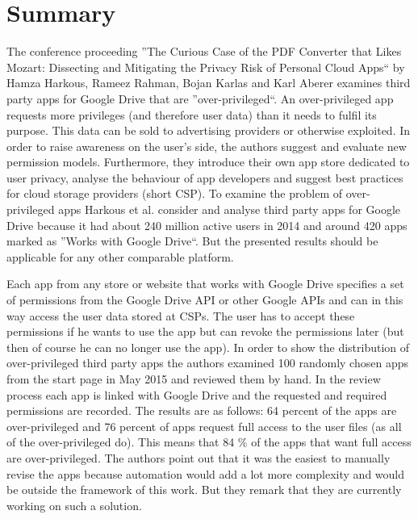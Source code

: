 \documentclass[11pt,twocolumn,a4paper,DIV=calc]{scrartcl}
\begin{document}
\section{Summary}
The conference proceeding ''The Curious Case of the PDF Converter that Likes Mozart: Dissecting and Mitigating the Privacy Risk of Personal Cloud Apps`` by Hamza Harkous, Rameez Rahman, Bojan Karlas and Karl Aberer \cite{Paper} examines third party apps for Google Drive that are ''over-privileged``. An over-privileged app requests more privileges (and therefore user data) than it needs to fulfil its purpose. This data can be sold to advertising providers or otherwise exploited. In order to raise awareness on the user's side, the authors suggest and evaluate new permission models. Furthermore, they introduce their own app store dedicated to user privacy, analyse the behaviour of app developers and suggest best practices for cloud storage providers (short CSP). To examine the problem of over-privileged apps Harkous et al. consider and analyse third party apps for Google Drive because it had about 240 million active users in 2014 and around 420 apps marked as ''Works with Google Drive``. But the presented results should be applicable for any other comparable platform. 

Each app from any store or website that works with Google Drive specifies a set of permissions from the Google Drive API or other Google APIs and can in this way access the user data stored at CSPs. The user has to accept these permissions if he wants to use the app but can revoke the permissions later (but then of course he can no longer use the app). In order to show the distribution of over-privileged third party apps the authors examined 100 randomly chosen apps from the start page in May 2015 and reviewed them by hand. In the review process each app is linked with Google Drive and the requested and required permissions are recorded. The results are as follows: 64 percent of the apps are over-privileged and 76 percent of apps request full access to the user files (as all of the over-privileged do). This means that 84 \% of the apps that want full access are over-privileged. The authors point out that it was the easiest to manually revise the apps because automation would add a lot more complexity and would be outside the framework of this work. But they remark that they are currently working on such a solution. 
\end{document}
